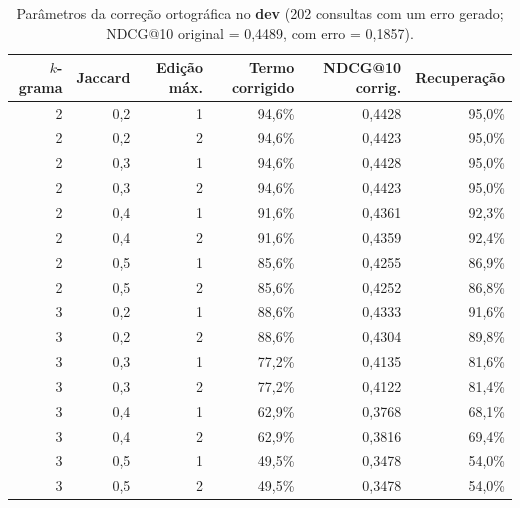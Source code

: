 \begin{table}[t]
\centering
\caption{Parâmetros da correção ortográfica no \textbf{dev} (202 consultas com um erro gerado; NDCG@10 original = 0,4489, com erro = 0,1857).}
\label{tab:dev_spell}
\footnotesize
\begin{tabular}{rrrrrr}
\toprule
$k$-grama & Jaccard & Edição máx. & Termo corrigido & NDCG@10 corrig. & Recuperação \\
\midrule
2 & 0,2 & 1 & 94,6\% & 0,4428 & 95,0\% \\
2 & 0,2 & 2 & 94,6\% & 0,4423 & 95,0\% \\
2 & 0,3 & 1 & 94,6\% & 0,4428 & 95,0\% \\
2 & 0,3 & 2 & 94,6\% & 0,4423 & 95,0\% \\
2 & 0,4 & 1 & 91,6\% & 0,4361 & 92,3\% \\
2 & 0,4 & 2 & 91,6\% & 0,4359 & 92,4\% \\
2 & 0,5 & 1 & 85,6\% & 0,4255 & 86,9\% \\
2 & 0,5 & 2 & 85,6\% & 0,4252 & 86,8\% \\
3 & 0,2 & 1 & 88,6\% & 0,4333 & 91,6\% \\
3 & 0,2 & 2 & 88,6\% & 0,4304 & 89,8\% \\
3 & 0,3 & 1 & 77,2\% & 0,4135 & 81,6\% \\
3 & 0,3 & 2 & 77,2\% & 0,4122 & 81,4\% \\
3 & 0,4 & 1 & 62,9\% & 0,3768 & 68,1\% \\
3 & 0,4 & 2 & 62,9\% & 0,3816 & 69,4\% \\
3 & 0,5 & 1 & 49,5\% & 0,3478 & 54,0\% \\
3 & 0,5 & 2 & 49,5\% & 0,3478 & 54,0\% \\
\bottomrule
\end{tabular}
\end{table}
